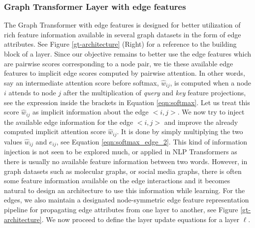 \documentclass[letterpaper]{article} %
\begin{document}
\subsubsection{Graph Transformer Layer with edge features} The Graph Transformer with edge features is designed for better utilization of rich feature information available in several graph datasets in the form of edge attributes. See Figure \ref{gt-architecture} (Right) for a reference to the building block of a layer. Since our objective remains to better use the edge features which are pairwise scores corresponding to a node pair, we tie these available edge features to implicit edge scores computed by pairwise attention. In other words, say an intermediate attention score before softmax, $\hat{w}_{ij}$, is computed when a node $i$ attends to node $j$ after the 
multiplication of \textit{query} and \textit{key} feature projections, see the expression inside the brackets in Equation \ref{eqn:softmax}. Let us treat this score $\hat{w}_{ij}$ as implicit information about the edge $<i,j>$. We now try to inject the available edge information for the edge $<i,j>$ and improve the already computed implicit attention score $\hat{w}_{ij}$. It is done by simply multiplying the two values $\hat{w}_{ij}$ and $e_{ij}$, see Equation \ref{eqn:softmax_edge_2}. This kind of information injection is not seen to be explored much, or applied in NLP Transformers as there is usually no available feature information between two words. However, in graph datasets such as molecular graphs, or social media graphs, there is often some feature information available on the edge interactions and it becomes natural to design an architecture to use this information while learning. For the edges,
we also maintain a designated node-symmetric edge feature representation pipeline for propagating edge attributes from one layer to another, see Figure \ref{gt-architecture}.
We now proceed to define the layer update equations for a layer $\ell$. 
\end{document}

